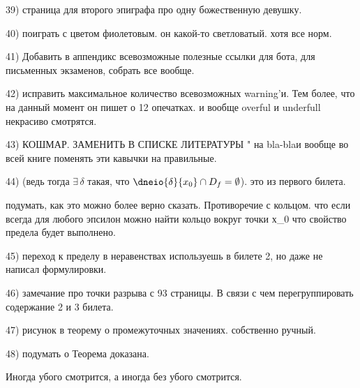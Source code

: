 39) страница для второго эпиграфа про одну божественную девушку.

40) поиграть с цветом фиолетовым. он какой-то светловатый. хотя все норм.

41) Добавить в аппендикс всевозможные полезные ссылки для бота, для письменных экзаменов, собрать все вообще.

42) исправить максимальное количество всевозможных warning'и. Тем более, что на данный момент он пишет о 12 опечатках. и вообще overful и underfull некрасиво смотрятся.

43) КОШМАР. ЗАМЕНИТЬ В СПИСКЕ ЛИТЕРАТУРЫ " на \glqq bla-bla\grqq и вообще во всей книге поменять эти кавычки на правильные.

44) (ведь тогда $\exists\, \delta$ такая, что $\dneio{\delta}{x_0}\cap D_f=\emptyset$). это из первого билета.

подумать, как это можно более верно сказать. Противоречие с кольцом. что если всегда для любого эпсилон можно найти кольцо вокруг точки х_0 что свойство предела будет выполнено.

45) переход к пределу в неравенствах используешь в билете 2, но даже не написал формулировки.

46) замечание про точки разрыва с 93 страницы. В связи с чем перегруппировать содержание 2 и 3 билета.

47) рисунок в теорему о промежуточных значениях. собственно ручный.

48) подумать о \noindent Теорема доказана. 

Иногда убого смотрится, а иногда без \noindent убого смотрится.